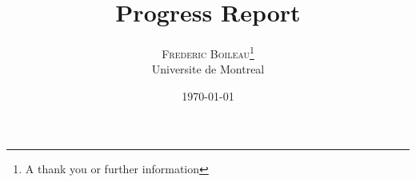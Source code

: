\setlength{\droptitle}{-4\baselineskip} %
\pretitle{\begin{center}\Huge\bfseries} %
\posttitle{\end{center}} %
\title{Progress Report} %
\author{
\textsc{Frederic Boileau}\thanks{A thank you or further information} \\[1ex] %
\normalsize Universite de Montreal \\ %
}
\date{\today} %
\renewcommand{\maketitlehookd}{%
\begin{abstract}
In our original project plan we had indicated that we wished to explore 
different network topologies to build a generative model for time series 
data, more specifically short text sequences. After parsing through the latest
literature we have opted for a RNN-LSTM network. They are several reasons for
this. The most simple option would have been to use a Hidden Markov Model
(HMM), however this topology suffers from several drawbacks, first the 
Markov assumption is unreasonably strong for most text processing and 
using an N'th order HMM is not an alternative as time complexity grows 
exponentially with N. The Recurrent Neural Network (RNN) type of neural
network allows one to introduce memory into an Artifical Neural Network (ANN)
while keeping the model tractable. However RNN's suffer from numerical issues,
most notably the vanishing-exploding gradient problem which is readily solved
using a Long-Short Term Model (LSTM). \\
\end{abstract}}

